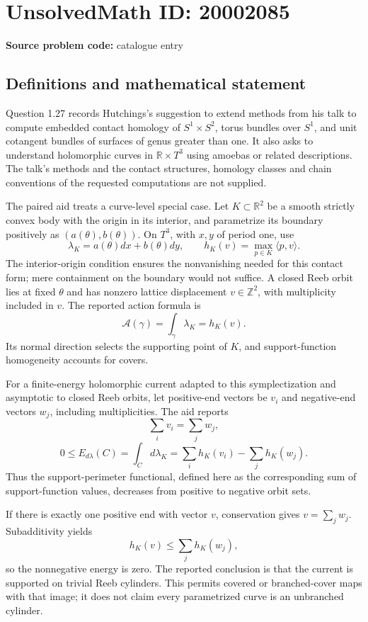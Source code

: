 \documentclass[11pt]{article}
\begin{document}
\section*{UnsolvedMath ID: 20002085}
\textbf{Source problem code:} catalogue entry
\subsection{Definitions and mathematical statement}
Question 1.27 records Hutchings's suggestion to extend methods from his talk to compute embedded contact homology of \(S^1\times S^2\), torus bundles over \(S^1\), and unit cotangent bundles of surfaces of genus greater than one. It also asks to understand holomorphic curves in \(\mathbb R\times T^3\) using amoebas or related descriptions. The talk's methods and the contact structures, homology classes and chain conventions of the requested computations are not supplied.

The paired aid treats a curve-level special case. Let \(K\subset\mathbb R^2\) be a smooth strictly convex body with the origin in its interior, and parametrize its boundary positively as \((a(\theta),b(\theta))\). On \(T^3\), with \(x,y\) of period one, use
\[
 \lambda_K=a(\theta)dx+b(\theta)dy,\qquad
 h_K(v)=\max_{p\in K}\langle p,v\rangle.
\]
The interior-origin condition ensures the nonvanishing needed for this contact form; mere containment on the boundary would not suffice. A closed Reeb orbit lies at fixed \(\theta\) and has nonzero lattice displacement \(v\in\mathbb Z^2\), with multiplicity included in \(v\). The reported action formula is
\[
 \mathcal A(\gamma)=\int_\gamma\lambda_K=h_K(v).
\]
Its normal direction selects the supporting point of \(K\), and support-function homogeneity accounts for covers.

For a finite-energy holomorphic current adapted to this symplectization and asymptotic to closed Reeb orbits, let positive-end vectors be \(v_i\) and negative-end vectors \(w_j\), including multiplicities. The aid reports
\[
 \sum_i v_i=\sum_j w_j,
\]
\[
 0\leq E_{d\lambda}(C)=\int_Cd\lambda_K
       =\sum_i h_K(v_i)-\sum_jh_K(w_j).
\]
Thus the support-perimeter functional, defined here as the corresponding sum of support-function values, decreases from positive to negative orbit sets.

If there is exactly one positive end with vector \(v\), conservation gives \(v=\sum_jw_j\). Subadditivity yields
\[
 h_K(v)\leq\sum_jh_K(w_j),
\]
so the nonnegative energy is zero. The reported conclusion is that the current is supported on trivial Reeb cylinders. This permits covered or branched-cover maps with that image; it does not claim every parametrized curve is an unbranched cylinder.
\end{document}
